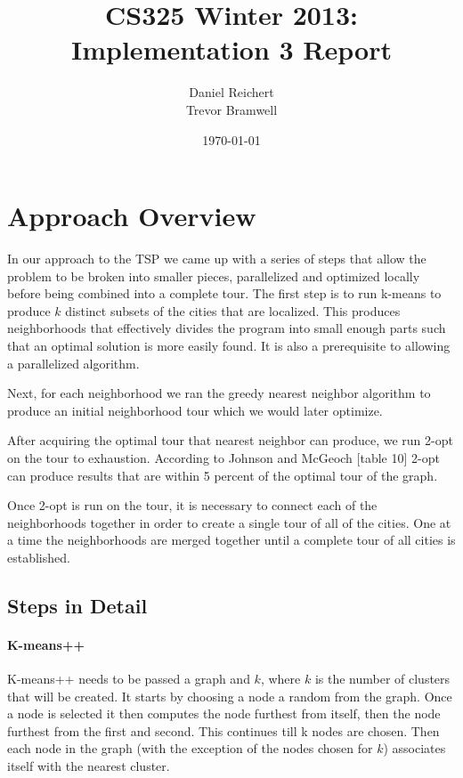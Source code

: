 \documentclass[12pt]{article}
\title{CS325 Winter 2013: Implementation 3 Report}
\author{
    Daniel Reichert \\
    Trevor Bramwell
}
\date{\today}
\begin{document}
\maketitle

\section*{Approach Overview}

In our approach to the TSP we came up with a series of steps that allow the
problem to be broken into smaller pieces, parallelized and optimized locally
before being combined into a complete tour.  The first step is to run k-means
to produce $k$ distinct subsets of the cities that are localized.  This
produces neighborhoods that effectively divides the program into small enough
parts such that an optimal solution is more easily found. It is also a
prerequisite to allowing a parallelized algorithm.  

Next, for each neighborhood we ran the greedy nearest neighbor algorithm to
produce an initial neighborhood tour which we would later optimize.

After acquiring the optimal tour that nearest neighbor can produce, we run
2-opt on the tour to exhaustion. According to Johnson and McGeoch [table 10]
2-opt can produce results that are within 5 percent of the optimal tour of the
graph.

Once 2-opt is run on the tour, it is necessary to connect each of the
neighborhoods together in order to create a single tour of all of the cities.
One at a time the neighborhoods are merged together until a complete tour of
all cities is established.

\subsection*{Steps in Detail}

\paragraph{K-means++}

K-means++ needs to be passed a graph and $k$, where $k$ is the number of
clusters that will be created. It starts by choosing a node a random
from the graph. Once a node is selected it then computes the node
furthest from itself, then the node furthest from the first and second.
This continues till k nodes are chosen. Then each node in the graph
(with the exception of the nodes chosen for $k$) associates itself with
the nearest cluster.
\end{document}
